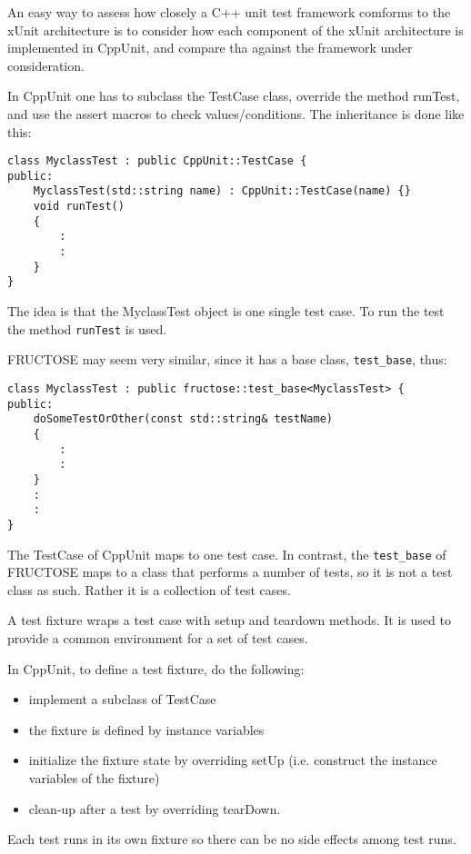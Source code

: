 \documentclass{book}
\begin{document}

An easy way to assess how closely a C++ unit test framework
comforms to the xUnit architecture is to consider how each component
of the xUnit architecture is implemented in CppUnit, and compare tha
against the framework under consideration.


In CppUnit one has to subclass the TestCase class,
override the method runTest, and use the assert macros
to check values/conditions. The inheritance is done like this:

\begin{verbatim}
class MyclassTest : public CppUnit::TestCase {
public:
    MyclassTest(std::string name) : CppUnit::TestCase(name) {}
    void runTest()
    {
        :
        :
    }
}
\end{verbatim}
The idea is that the MyclassTest object is one single test case. To run the test the
method {\tt runTest} is used.

FRUCTOSE may seem very similar, since it has a base class,
{\tt test\_base}, thus:
\begin{verbatim}
class MyclassTest : public fructose::test_base<MyclassTest> {
public:
    doSomeTestOrOther(const std::string& testName)
    {
        :
        :
    }
    :
    :
}
\end{verbatim}
The TestCase of CppUnit maps to one test case.
In contrast, the {\tt test\_base} of FRUCTOSE maps to a class that performs a number
of tests, so it is not a test class as such. Rather it is a collection of
test cases.


A test fixture wraps a test case with setup and teardown methods.
It is used to provide a common environment for a set of test cases.

In CppUnit, to define a test fixture, do the following:
\begin{itemize}
\item implement a subclass of TestCase
\item the fixture is defined by instance variables
\item initialize the fixture state by overriding setUp (i.e. construct the 
instance variables of the fixture)
\item clean-up after a test by overriding tearDown.
\end{itemize}
Each test runs in its own fixture so there can be no side effects among test runs.
\end{document}
